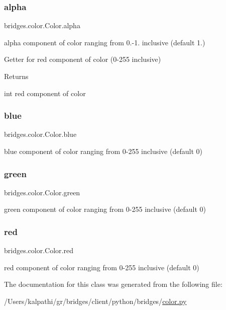 \subsubsection{\texorpdfstring{alpha}{alpha}}
{\footnotesize\ttfamily bridges.\+color.\+Color.\+alpha}



alpha component of color ranging from 0.-\/1. inclusive (default 1.) 

Getter for red component of color (0-\/255 inclusive) \begin{DoxyReturn}{Returns}


int red component of color 
\end{DoxyReturn}
\mbox{\label{classbridges_1_1color_1_1_color_a2c5081c47a43419bb1c5dbbd9c72a21e}} 
\subsubsection{\texorpdfstring{blue}{blue}}
{\footnotesize\ttfamily bridges.\+color.\+Color.\+blue}



blue component of color ranging from 0-\/255 inclusive (default 0) 

\mbox{\label{classbridges_1_1color_1_1_color_a6f14b2d3ec82052c1aeb259ee687059d}} 
\subsubsection{\texorpdfstring{green}{green}}
{\footnotesize\ttfamily bridges.\+color.\+Color.\+green}



green component of color ranging from 0-\/255 inclusive (default 0) 

\mbox{\label{classbridges_1_1color_1_1_color_abb0aa417808af0140d3448a2e49d2d15}} 
\subsubsection{\texorpdfstring{red}{red}}
{\footnotesize\ttfamily bridges.\+color.\+Color.\+red}



red component of color ranging from 0-\/255 inclusive (default 0) 



The documentation for this class was generated from the following file\+:\begin{DoxyCompactItemize}
\item 
/\+Users/kalpathi/gr/bridges/client/python/bridges/\mbox{\hyperlink{color_8py}{color.\+py}}\end{DoxyCompactItemize}

